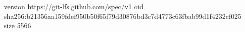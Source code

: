 version https://git-lfs.github.com/spec/v1
oid sha256:b21356aa159fdef950b50f65f79d30876bd3c7d4773c63fbab99d1f4232cf025
size 5566
